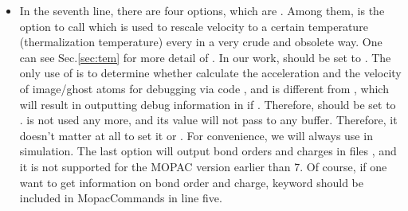 \documentclass[11pt]{JHEP3}
\begin{document}
\begin{itemize}
\item In the seventh line, there are four options, which are
. Among them,  is
the option to call  which is used to rescale
velocity to a certain temperature  (thermalization
temperature) every  in a very crude and obsolete
way. One can see Sec.\ref{sec:tem} for more detail of
. In our work,  should be set
to . The only use of  is to determine whether
calculate the acceleration and the velocity of image/ghost atoms for
debugging via code , and
 is different from , which will result in
outputting debug information in  if .
Therefore,  should be set to . 
is not used any more, and its value will not pass to any buffer.
Therefore, it doesn't matter at all to set it  or
. For convenience, we will always use  in
simulation. The last option  will output bond
orders and charges in files , and it is not supported for the MOPAC version earlier than
7. Of course, if one want to get information on bond order and
charge, keyword  should be included in MopacCommands in
line five.


\end{itemize}
\end{document}
